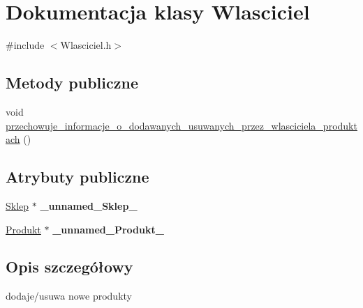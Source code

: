 \hypertarget{class_wlasciciel}{\section{Dokumentacja klasy Wlasciciel}
\label{class_wlasciciel}
}


{\ttfamily \#include $<$Wlasciciel.\+h$>$}

\subsection*{Metody publiczne}
\begin{DoxyCompactItemize}
\item 
void \hyperlink{class_wlasciciel_a2818c843f0480c26df3d38a9a5d35b5f}{przechowuje\+\_\+informacje\+\_\+o\+\_\+dodawanych\+\_\+usuwanych\+\_\+przez\+\_\+wlasciciela\+\_\+produktach} ()
\end{DoxyCompactItemize}
\subsection*{Atrybuty publiczne}
\begin{DoxyCompactItemize}
\item 
\hypertarget{class_wlasciciel_a05f53e7e9e4172c25573a975e5b96afb}{\hyperlink{class_sklep}{Sklep} $\ast$ {\bfseries \+\_\+unnamed\+\_\+\+Sklep\+\_\+}}\label{class_wlasciciel_a05f53e7e9e4172c25573a975e5b96afb}

\item 
\hypertarget{class_wlasciciel_a6115095735582d5e3756d16ec9c5da5c}{\hyperlink{class_produkt}{Produkt} $\ast$ {\bfseries \+\_\+unnamed\+\_\+\+Produkt\+\_\+}}\label{class_wlasciciel_a6115095735582d5e3756d16ec9c5da5c}

\end{DoxyCompactItemize}


\subsection{Opis szczegółowy}
dodaje/usuwa nowe produkty 

